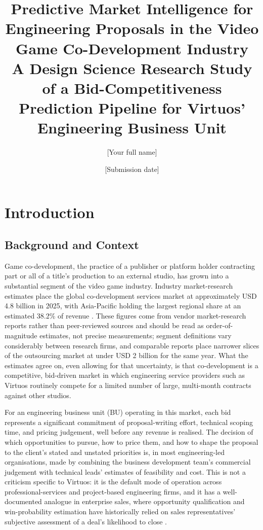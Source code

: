 \documentclass[12pt,oneside]{report}
\title{Predictive Market Intelligence for Engineering Proposals in the Video Game Co-Development Industry \\[0.5em]
\large A Design Science Research Study of a Bid-Competitiveness Prediction Pipeline for Virtuos' Engineering Business Unit}
\author{[Your full name]}
\date{[Submission date]}
\begin{document}
\maketitle
\tableofcontents
\listoffigures

\hypertarget{introduction}{%
\chapter{Introduction}\label{introduction}}

\hypertarget{background-and-context}{%
\section{Background and Context}\label{background-and-context}}

Game co-development, the practice of a publisher or platform holder
contracting part or all of a title's production to an external studio,
has grown into a substantial segment of the video game industry.
Industry market-research estimates place the global co-development
services market at approximately USD 4.8 billion in 2025, with
Asia-Pacific holding the largest regional share at an estimated 38.2\%
of revenue \citep{marketintelo2025gamecodev}. These figures come from
vendor market-research reports rather than peer-reviewed sources and
should be read as order-of-magnitude estimates, not precise
measurements; segment definitions vary considerably between research
firms, and comparable reports place narrower slices of the outsourcing
market at under USD 2 billion for the same year. What the estimates
agree on, even allowing for that uncertainty, is that co-development is
a competitive, bid-driven market in which engineering service providers
such as Virtuos routinely compete for a limited number of large,
multi-month contracts against other studios.

For an engineering business unit (BU) operating in this market, each bid
represents a significant commitment of proposal-writing effort,
technical scoping time, and pricing judgement, well before any revenue
is realised. The decision of which opportunities to pursue, how to price
them, and how to shape the proposal to the client's stated and unstated
priorities is, in most engineering-led organisations, made by combining
the business development team's commercial judgement with technical
leads' estimates of feasibility and cost. This is not a criticism
specific to Virtuos: it is the default mode of operation across
professional-services and project-based engineering firms, and it has a
well-documented analogue in enterprise sales, where opportunity
qualification and win-probability estimation have historically relied on
sales representatives' subjective assessment of a deal's likelihood to
close \citep{yan2015sales}.
\end{document}
